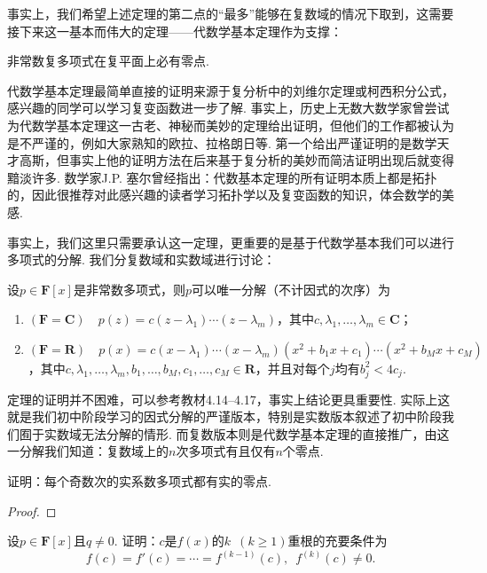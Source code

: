 事实上，我们希望上述定理的第二点的``最多''能够在复数域的情况下取到，这需要接下来这一基本而伟大的定理——代数学基本定理作为支撑：
\begin{theorem}[代数学基本定理] \label{thm:17:代数学基本定理} 
    非常数复多项式在复平面上必有零点.
\end{theorem}

代数学基本定理最简单直接的证明来源于复分析中的刘维尔定理或柯西积分公式，感兴趣的同学可以学习复变函数进一步了解. 事实上，历史上无数大数学家曾尝试为代数学基本定理这一古老、神秘而美妙的定理给出证明，但他们的工作都被认为是不严谨的，例如大家熟知的欧拉、拉格朗日等. 第一个给出严谨证明的是数学天才高斯，但事实上他的证明方法在后来基于复分析的美妙而简洁证明出现后就变得黯淡许多. 数学家J.P. 塞尔曾经指出：代数基本定理的所有证明本质上都是拓扑的，因此很推荐对此感兴趣的读者学习拓扑学以及复变函数的知识，体会数学的美感.

事实上，我们这里只需要承认这一定理，更重要的是基于代数学基本我们可以进行多项式的分解. 我们分复数域和实数域进行讨论：
\begin{theorem} \label{thm:17:多项式分解}
    设$p\in\mathbf{F}[x]$是非常数多项式，则$p$可以唯一分解（不计因式的次序）为
    \begin{enumerate}
        \item $(\mathbf{F}=\mathbf{C})\quad p(z)=c(z-\lambda_1)\cdots(z-\lambda_m)$，其中$c,\lambda_1,\ldots,\lambda_m\in\mathbf{C}$；

        \item $(\mathbf{F}=\mathbf{R})\quad p(x)=c(x-\lambda_1)\cdots(x-\lambda_m)(x^2+b_1x+c_1)\cdots(x^2+b_Mx+c_M)$，其中$c,\lambda_1,\ldots,\lambda_m,b_1,\ldots,b_M,c_1,\ldots,c_M\in\mathbf{R}$，并且对每个$j$均有$b_j^2<4c_j$.
    \end{enumerate}
\end{theorem}
定理的证明并不困难，可以参考教材4.14--4.17，事实上结论更具重要性. 实际上这就是我们初中阶段学习的因式分解的严谨版本，特别是实数版本叙述了初中阶段我们囿于实数域无法分解的情形. 而复数版本则是代数学基本定理的直接推广，由这一分解我们知道：复数域上的$n$次多项式有且仅有$n$个零点.
\begin{example}
    证明：每个奇数次的实系数多项式都有实的零点.
\end{example}

\begin{proof}

\end{proof}

\begin{example}
    设$p\in\mathbf{F}[x]$且$q\neq 0$. 证明：$c$是$f(x)$的$k\enspace(k\geqslant 1)$重根的充要条件为
    \[f(c)=f'(c)=\cdots=f^{(k-1)}(c),\enspace f^{(k)}(c)\neq 0.\]
\end{example}

